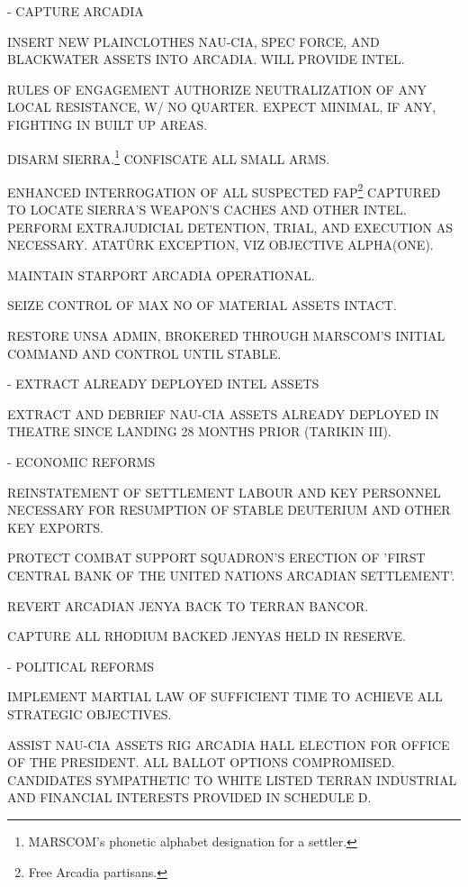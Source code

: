 \item {} - CAPTURE ARCADIA
    \startitemize[n]
    \item INSERT NEW PLAINCLOTHES NAU-CIA, SPEC FORCE, AND BLACKWATER ASSETS INTO ARCADIA. WILL PROVIDE INTEL.
    \item RULES OF ENGAGEMENT AUTHORIZE NEUTRALIZATION OF ANY LOCAL RESISTANCE, W/ NO QUARTER. EXPECT MINIMAL, IF ANY, FIGHTING IN BUILT UP AREAS.
    \item DISARM SIERRA.\footnote{MARSCOM's phonetic alphabet designation for a settler.} CONFISCATE ALL SMALL ARMS.
    \item ENHANCED INTERROGATION OF ALL SUSPECTED FAP\footnote{Free Arcadia partisans.} CAPTURED TO LOCATE SIERRA'S WEAPON'S CACHES AND OTHER INTEL. PERFORM EXTRAJUDICIAL DETENTION, TRIAL, AND EXECUTION AS NECESSARY. ATATÜRK EXCEPTION, VIZ OBJECTIVE ALPHA(ONE).
    \item MAINTAIN STARPORT ARCADIA OPERATIONAL.
    \item SEIZE CONTROL OF MAX NO OF MATERIAL ASSETS INTACT.
    \item RESTORE UNSA ADMIN, BROKERED THROUGH MARSCOM'S INITIAL COMMAND AND CONTROL UNTIL STABLE.
    \stopitemize

\item {} - EXTRACT ALREADY DEPLOYED INTEL ASSETS
    \startitemize[n]
    \item EXTRACT AND DEBRIEF NAU-CIA ASSETS ALREADY DEPLOYED IN THEATRE SINCE LANDING 28 MONTHS PRIOR (TARIKIN III).
    \stopitemize

\item {} - ECONOMIC REFORMS
    \startitemize[n]
    \item REINSTATEMENT OF SETTLEMENT LABOUR AND KEY PERSONNEL NECESSARY FOR RESUMPTION OF STABLE DEUTERIUM AND OTHER KEY EXPORTS.
    \item PROTECT COMBAT SUPPORT SQUADRON'S ERECTION OF 'FIRST CENTRAL BANK OF THE UNITED NATIONS ARCADIAN SETTLEMENT'.
    \item REVERT ARCADIAN JENYA BACK TO TERRAN BANCOR.
    \item CAPTURE ALL RHODIUM BACKED JENYAS HELD IN RESERVE.
    \stopitemize

\item {} - POLITICAL REFORMS
    \startitemize[n]
    \item IMPLEMENT MARTIAL LAW OF SUFFICIENT TIME TO ACHIEVE ALL STRATEGIC OBJECTIVES.
    \item ASSIST NAU-CIA ASSETS RIG ARCADIA HALL ELECTION FOR OFFICE OF THE PRESIDENT. ALL BALLOT OPTIONS COMPROMISED. CANDIDATES SYMPATHETIC TO WHITE LISTED TERRAN INDUSTRIAL AND FINANCIAL INTERESTS PROVIDED IN SCHEDULE D.
    \stopitemize
\stopitemize

